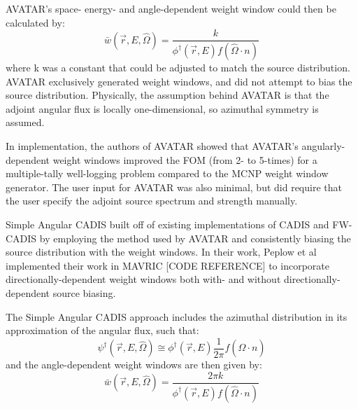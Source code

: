 AVATAR's space- energy- and angle-dependent weight window could then be calculated by:
\begin{equation}
\bar {w} (\vec{r},E,\hat\Omega) = \frac{k}{\phi^{\dagger}(\vec{r},E) f(\hat\Omega \cdot n)}
\end{equation}
where k was a constant that could be adjusted to match the source distribution. AVATAR exclusively generated weight windows, and did not attempt to bias the source distribution. Physically, the assumption behind AVATAR is that the adjoint angular flux is locally one-dimensional, so azimuthal symmetry is assumed. 

In implementation, the authors of AVATAR showed that AVATAR's angularly-dependent weight windows improved the FOM (from 2- to 5-times) for a multiple-tally well-logging problem compared to the MCNP weight window generator. The user input for AVATAR was also minimal, but did require that the user specify the adjoint source spectrum and strength manually. 
%
%


Simple Angular CADIS \cite{peplow_consistent_2012} built off of existing implementations of CADIS and FW-CADIS by employing the method used by AVATAR and consistently biasing the source distribution with the weight windows. In their work, Peplow et al implemented their work in MAVRIC [CODE REFERENCE] to incorporate directionally-dependent weight windows both with- and without directionally-dependent source biasing. 

The Simple Angular CADIS approach includes the azimuthal distribution in its approximation of the angular flux, such that:
\begin{equation}
\psi^{\dagger}(\vec{r}, E, \hat \Omega) \cong \phi^{\dagger}(\vec{r}, E) \frac{1}{2\pi} f(\hat\Omega \cdot n)
\end{equation}
and the angle-dependent weight windows are then given by:
\begin{equation}
\bar {w} (\vec{r},E,\hat\Omega) = \frac{2 \pi k}{\phi^{\dagger}(\vec{r},E) f(\hat\Omega \cdot n)}
\end{equation}

